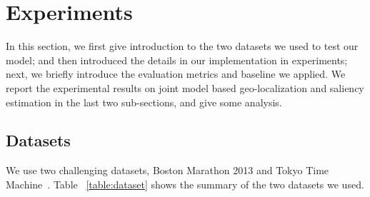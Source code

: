 \section{Experiments}
\label{sec:expr}

In this section, we first give introduction to the two datasets we used to test our model; 
and then introduced the details in our implementation in experiments; 
next, we briefly introduce the evaluation metrics and baseline we applied.
We report the experimental results on joint model based geo-localization and saliency estimation in the last two sub-sections, and give some analysis.

\subsection{Datasets}
We use two challenging datasets, Boston Marathon 2013\cite{chen2016boston} and Tokyo Time Machine~\cite{Arandjelovic16}. 
Table ~\ref{table:dataset} shows the summary of the two datasets we used.
